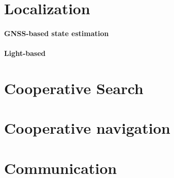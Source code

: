 \documentclass{article}
\begin{document}
	\section{Localization}
		\paragraph{GNSS-based state estimation}
			\cite{spurny-2017-cooperative-autonomous-search-grasping-and-delivering-in-a-treasure-hunt-scenario-by-a-team-of-uavs}
		\paragraph{Light-based}
			\cite{walter-2018-mutual-localization-of-uavs-based-on-blinking-ultraviolet-markers-and-3d-time-position-hough-transform}
	\section{Cooperative Search}
	\cite{spurny-2017-cooperative-autonomous-search-grasping-and-delivering-in-a-treasure-hunt-scenario-by-a-team-of-uavs}
	\section{Cooperative navigation}
	\cite{spurny-2017-cooperative-autonomous-search-grasping-and-delivering-in-a-treasure-hunt-scenario-by-a-team-of-uavs}
	\section{Communication}
	
\end{document}
